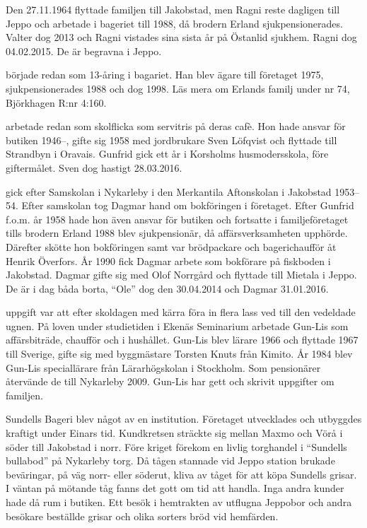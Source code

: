 Den 27.11.1964 flyttade familjen till Jakobstad, men Ragni reste dagligen till Jeppo och arbetade i bageriet till 1988, då brodern Erland sjukpensionerades. Valter dog 2013 och Ragni vistades sina sista år på Östanlid sjukhem. Ragni dog 04.02.2015. De är begravna i Jeppo.

 började redan som 13-åring i bagariet. Han blev ägare till företaget 1975, sjukpensionerades 1988 och dog 1998. Läs mera om Erlands familj under nr 74, Björkhagen R:nr 4:160.

 arbetade redan som skolflicka som servitris på deras cafè. Hon hade ansvar för butiken 1946--, gifte sig 1958 med jordbrukare Sven Löfqvist och flyttade till Strandbyn i Oravais. Gunfrid gick ett år i Korsholms husmodersskola, före giftermålet. Sven dog hastigt 28.03.2016.

 gick efter Samskolan i Nykarleby i den Merkantila Aftonskolan i Jakobstad 1953--54. Efter samskolan tog Dagmar hand om bokföringen i företaget. Efter Gunfrid f.o.m. år 1958 hade hon även ansvar för butiken och fortsatte i familjeföretaget tills brodern Erland 1988 blev sjukpensionär, då affärsverksamheten upphörde. Därefter skötte hon bokföringen samt var brödpackare och bagerichaufför åt Henrik Överfors. År 1990 fick Dagmar arbete som bokförare på fiskboden i Jakobstad. Dagmar gifte sig med Olof Norrgård och flyttade till Mietala i Jeppo. De är i dag båda borta, ``Ole'' dog den 30.04.2014 och Dagmar 31.01.2016.

 uppgift var att efter skoldagen med kärra föra in flera lass ved till den vedeldade ugnen. På loven under studietiden i Ekenäs Seminarium arbetade Gun-Lis som affärsbiträde, chaufför och i hushållet. Gun-Lis blev lärare 1966 och flyttade 1967 till Sverige, gifte sig  med byggmästare Torsten Knuts från Kimito. År 1984 blev Gun-Lis speciallärare från Lärarhögskolan i Stockholm. Som pensionärer återvände de till Nykarleby 2009. Gun-Lis har gett och skrivit uppgifter om familjen.

Sundells Bageri blev något av en institution. Företaget utvecklades och utbyggdes kraftigt under Einars tid. Kundkretsen sträckte sig mellan Maxmo och Vörå i söder till Jakobstad i norr. Före kriget förekom en livlig torghandel i ``Sundells bullabod'' på Nykarleby torg. Då tågen stannade vid Jeppo station brukade beväringar, på väg norr- eller  söderut, kliva av tåget för att köpa Sundells grisar. I väntan på mötande tåg fanns det gott om tid att handla. Inga andra kunder hade då rum i butiken. Ett besök i hemtrakten av utflugna Jeppobor och andra besökare beställde grisar och olika sorters bröd vid hemfärden.


